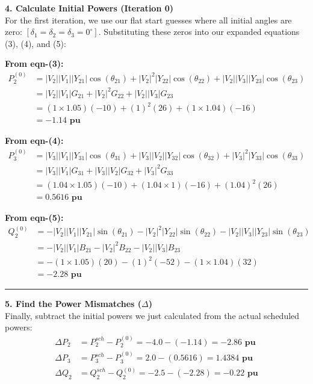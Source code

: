 \documentclass[11pt]{article}
\begin{document}
\begin{stepbox}
\textbf{4. Calculate Initial Powers (Iteration 0)} \\
For the first iteration, we use our flat start guesses where all initial angles are zero: $[\delta_1 = \delta_2 = \delta_3 = 0^\circ]$. Substituting these zeros into our expanded equations (3), (4), and (5):

\noindent \textbf{From eqn-(3):}
\begin{align*}
    P_2^{(0)} &= |V_2||V_1||Y_{21}| \cos(\theta_{21}) + |V_2|^2|Y_{22}| \cos(\theta_{22}) + |V_2||V_3||Y_{23}| \cos(\theta_{23}) \\
    &= |V_2||V_1|G_{21} + |V_2|^2 G_{22} + |V_2||V_3|G_{23} \\
    &= (1 \times 1.05)(-10) + (1)^2(26) + (1 \times 1.04)(-16) \\
    &= \mathbf{-1.14 \text{ pu}}
\end{align*}

\noindent \textbf{From eqn-(4):}
\begin{align*}
    P_3^{(0)} &= |V_3||V_1||Y_{31}| \cos(\theta_{31}) + |V_3||V_2||Y_{32}| \cos(\theta_{32}) + |V_3|^2|Y_{33}| \cos(\theta_{33}) \\
    &= |V_3||V_1|G_{31} + |V_3||V_2|G_{32} + |V_3|^2 G_{33} \\
    &= (1.04 \times 1.05)(-10) + (1.04 \times 1)(-16) + (1.04)^2(26) \\
    &= \mathbf{0.5616 \text{ pu}}
\end{align*}

\noindent \textbf{From eqn-(5):}
\begin{align*}
    Q_2^{(0)} &= -|V_2||V_1||Y_{21}| \sin(\theta_{21}) - |V_2|^2|Y_{22}| \sin(\theta_{22}) - |V_2||V_3||Y_{23}| \sin(\theta_{23}) \\
    &= -|V_2||V_1|B_{21} - |V_2|^2 B_{22} - |V_2||V_3|B_{23} \\
    &= -(1 \times 1.05)(20) - (1)^2(-52) - (1 \times 1.04)(32) \\
    &= \mathbf{-2.28 \text{ pu}}
\end{align*}

\vspace{0.3cm}
\hrule
\vspace{0.3cm}

\textbf{5. Find the Power Mismatches ($\Delta$)} \\
Finally, subtract the initial powers we just calculated from the actual scheduled powers:
\begin{align*}
    \Delta P_2 &= P_2^{sch} - P_2^{(0)} = -4.0 - (-1.14) = \mathbf{-2.86 \text{ pu}} \\
    \Delta P_3 &= P_3^{sch} - P_3^{(0)} = 2.0 - (0.5616) = \mathbf{1.4384 \text{ pu}} \\
    \Delta Q_2 &= Q_2^{sch} - Q_2^{(0)} = -2.5 - (-2.28) = \mathbf{-0.22 \text{ pu}}
\end{align*}
\end{stepbox}
\end{document}
